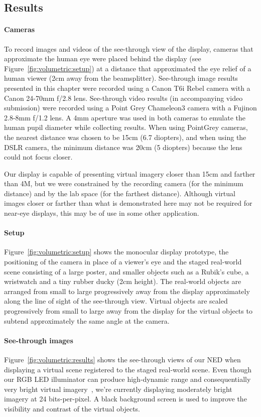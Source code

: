 
\subsection{Results}
\label{sec:volumetric:results}
\paragraph{Cameras}
To record images and videos of the see-through view of the display, cameras that approximate the human eye were placed behind the display (see Figure~\ref{fig:volumetric:setup}) at a distance that approximated the eye relief of a human viewer (2cm away from the beamsplitter). See-through image results presented in this chapter were recorded using a Canon T6i Rebel camera with a Canon 24-70mm f/2.8 lens. See-through video results (in accompanying video submission) were recorded using a Point Grey Chameleon3 camera with a Fujinon 2.8-8mm f/1.2 lens. A 4mm aperture was used in both cameras to emulate the human pupil diameter while collecting results. When using PointGrey cameras, the nearest distance was chosen to be 15cm (6.7 diopters), and when using the DSLR camera, the minimum distance was 20cm (5 diopters) because the lens could not focus closer. 

Our display is capable of presenting virtual imagery closer than 15cm and farther than 4M, but we were constrained by the recording camera (for the minimum distance) and by the lab space (for the farthest distance). Although virtual images closer or farther than what is demonstrated here may not be required for near-eye displays, this may be of use in some other application.

\paragraph{Setup}
Figure~\ref{fig:volumetric:setup} shows the monocular display prototype, the positioning of the camera in place of a viewer's eye and the staged real-world scene consisting of a large poster, and smaller objects such as a Rubik's cube, a wristwatch and a tiny rubber ducky (2cm height). The real-world objects are arranged from small to large progressively away from the display approximately along the line of sight of the see-through view. Virtual objects are scaled progressively from small to large away from the display for the virtual objects to subtend approximately the same angle at the camera. 

\paragraph{See-through images}
Figure~\ref{fig:volumetric:results} shows the see-through views of our NED when displaying a virtual scene registered to the staged real-world scene. Even though our RGB LED illuminator can produce high-dynamic range and consequentially very bright virtual imagery~\cite{Lincoln2017scene}, we're currently displaying moderately bright imagery at 24 bits-per-pixel. A black background screen is used to improve the visibility and contrast of the virtual objects.

